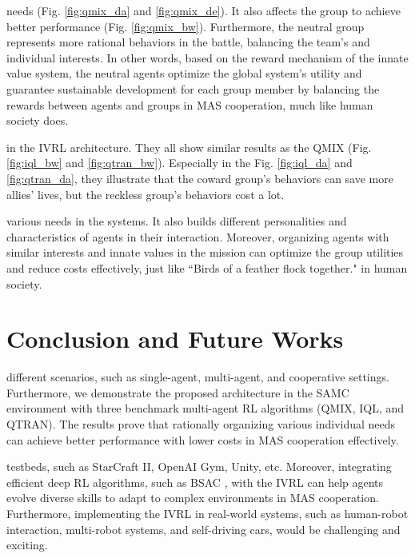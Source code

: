 \documentclass[letterpaper]{article} %
\begin{document}
 needs (Fig. \ref{fig:qmix_da} and \ref{fig:qmix_de}). It also affects the group to achieve better performance (Fig. \ref{fig:qmix_bw}). Furthermore, the neutral group represents more rational behaviors in the battle, balancing the team's and individual interests. In other words, based on the reward mechanism of the innate value system, the neutral agents optimize the global system’s utility and guarantee sustainable development for each group member by balancing the rewards between agents and groups in MAS cooperation, much like human society does.

 in the IVRL architecture. They all show similar results as the QMIX (Fig. \ref{fig:iql_bw} and \ref{fig:qtran_bw}). Especially in the Fig. \ref{fig:iql_da} and \ref{fig:qtran_da}, they illustrate that the coward group's behaviors can save more allies' lives, but the reckless group's behaviors cost a lot.

 various needs in the systems. It also builds different personalities and characteristics of agents in their interaction. Moreover, organizing agents with similar interests and innate values in the mission can optimize the group utilities and reduce costs effectively, just like ``Birds of a feather flock together." in human society.

\section{Conclusion and Future Works}

 different scenarios, such as single-agent, multi-agent, and cooperative settings. Furthermore, we demonstrate the proposed architecture in the SAMC environment with three benchmark multi-agent RL algorithms (QMIX, IQL, and QTRAN). The results prove that rationally organizing various individual needs can achieve better performance with lower costs in MAS cooperation effectively.

 testbeds, such as StarCraft II, OpenAI Gym, Unity, etc. Moreover, integrating efficient deep RL algorithms, such as BSAC \cite{yang2023strategy,yang2022bsac}, with the IVRL can help agents evolve diverse skills to adapt to complex environments in MAS cooperation. Furthermore, implementing the IVRL in real-world systems, such as human-robot interaction, multi-robot systems, and self-driving cars, would be challenging and exciting.


\clearpage

\end{document}
